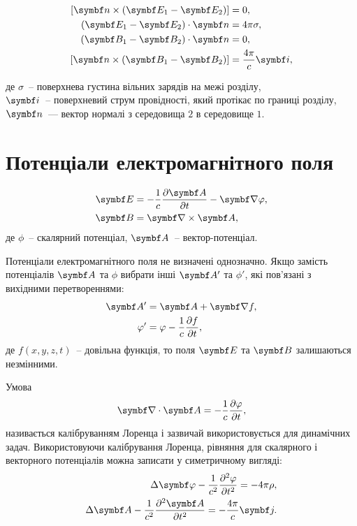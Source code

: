 \begin{align}
	\left[ \vect{n} \times (\Efield_{1} - \Efield_{2}) \right] & = 0, \label{EnBc}                        \\
	\left( \Efield_{1} - \Efield_{2}\right) \cdot \vect{n}     & = 4\pi\sigma, \label{EtauBc}             \\
	\left( \Bfield_{1} - \Bfield_{2}\right) \cdot \vect{n}     & = 0,    \label{BnBc}                     \\
	\left[ \vect{n} \times (\Bfield_{1} - \Bfield_{2}) \right] & = \frac{4\pi}{c}\vect{i} \label{BtauBc},
\end{align}

\noindent%
де $\sigma$~-- поверхнева густина вільних зарядів на межі розділу,\\
$\vect{i}$~-- поверхневий струм провідності, який протікає по границі розділу, \\
$\vect{n}$~--- вектор нормалі з середовища $2$  в середовище $1$.

\section{Потенціали електромагнітного поля}

\begin{align}
	\Efield & = -\frac{1}{c}\frac{\partial \vect{A}}{\partial t} - \vect{\nabla}\phi, \label{E=phi+A} \\
	\Bfield & = \rot\vect{A},
\end{align}
де $\phi$~-- скалярний потенціал, $ \vect{A} $~-- вектор-потенціал.

Потенціали електромагнітного поля не визначені однозначно. Якщо замість потенціалів $\vect{A}$ та $\phi$ вибрати інші $\vect{A}'$ та $\phi'$, які пов'язані з вихідними перетвореннями:
\begin{align}
	\vect{A}' & = \vect{A} +\vect{\nabla}f,                     \\
	\phi'     & = \phi - \frac1c \frac{\partial f}{\partial t},
\end{align}
де  $f(x,y,z,t)$~-- довільна функція, то поля $\Efield$ та $\Bfield$ залишаються незмінними.

Умова
\begin{equation}\label{Lorentz_gauge}
	\vect\nabla\cdot\vect{A} = - \frac{1}{c}\frac{\partial\phi}{\partial t},
\end{equation}
називається калібруванням Лоренца і зазвичай використовується для динамічних задач.
Використовуючи калібрування Лоренца, рівняння для скалярного і векторного потенціалів можна записати у симетричному вигляді:
\begin{align}\label{Maxwell_equations_via_potantials}
	\Delta \vect{\phi} - \frac{1}{c^2} \frac{\partial^2 \phi}{\partial t^2} = -4\pi\rho, \\
	\Delta \vect{A} - \frac{1}{c^2} \frac{\partial^2 \vect{A}}{\partial t^2} = - \frac{4\pi}{c}\vect{j}.
\end{align}

